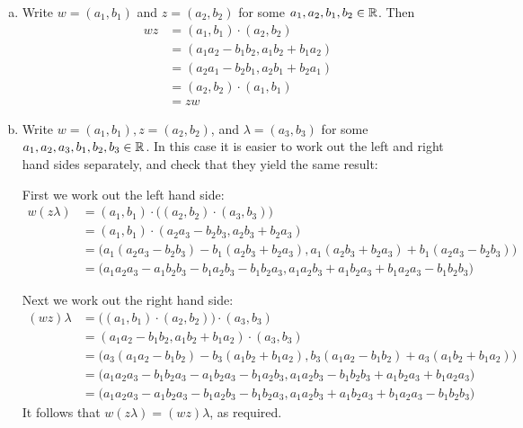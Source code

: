 \documentclass[11pt,fleqn,dvipsnames,usenames]{article}
\begin{document}
\begin{enumerate}
\begin{enumerate}[(a)]
\item Write $w = (a_{1},b_{1})$ and $z = (a_{2},b_{2})$ for some $a_{1},a_{2},b_{1},b_{2}\in\mathbb{R}$.  Then
\begin{align*}
wz &= (a_{1},b_{1})\cdot (a_{2},b_{2})\\
&= (a_{1}a_{2} - b_{1}b_{2},a_{1}b_{2} + b_{1}a_{2})\\
&= (a_{2}a_{1} - b_{2}b_{1},a_{2}b_{1} + b_{2}a_{1})\\
&= (a_{2},b_{2})\cdot (a_{1},b_{1})\\
&= zw
\end{align*}

\item \label{associativityofmult} Write $w = (a_{1},b_{1}), z = (a_{2},b_{2})$, and $\lambda = (a_{3},b_{3})$ for some $a_{1},a_{2},a_{3},b_{1},b_{2},b_{3}\in\mathbb{R}$.  In this case it is easier to work out the left and right hand sides separately, and check that they yield the same result:
\vsmsp

First we work out the left hand side:
\begin{align*}
w(z\lambda) &= (a_{1},b_{1})\cdot\big((a_{2},b_{2})\cdot (a_{3},b_{3})\big)\\
&= (a_{1},b_{1})\cdot (a_{2}a_{3} - b_{2}b_{3},a_{2}b_{3} + b_{2}a_{3})\\
&= \big(a_{1}(a_{2}a_{3}-b_{2}b_{3}) - b_{1}(a_{2}b_{3} + b_{2}a_{3}), a_{1}(a_{2}b_{3} + b_{2}a_{3}) + b_{1}(a_{2}a_{3} - b_{2}b_{3})\big)\\
&= \big(a_{1}a_{2}a_{3} - a_{1}b_{2}b_{3} - b_{1}a_{2}b_{3} - b_{1}b_{2}a_{3}, a_{1}a_{2}b_{3} + a_{1}b_{2}a_{3} + b_{1}a_{2}a_{3} - b_{1}b_{2}b_{3}\big)
\end{align*}

Next we work out the right hand side:
\begin{align*}
(wz)\lambda &= \big((a_{1},b_{1})\cdot(a_{2},b_{2})\big)\cdot (a_{3},b_{3})\\
&= (a_{1}a_{2} - b_{1}b_{2}, a_{1}b_{2} + b_{1}a_{2})\cdot (a_{3},b_{3})\\
&= \big(a_{3}(a_{1}a_{2} - b_{1}b_{2}) - b_{3}(a_{1}b_{2} + b_{1}a_{2}), b_{3}(a_{1}a_{2} - b_{1}b_{2}) + a_{3}(a_{1}b_{2} + b_{1}a_{2})\big)\\
&= \big(a_{1}a_{2}a_{3} - b_{1}b_{2}a_{3} - a_{1}b_{2}a_{3} - b_{1}a_{2}b_{3}, a_{1}a_{2}b_{3} - b_{1}b_{2}b_{3}+a_{1}b_{2}a_{3} + b_{1}a_{2}a_{3}\big)\\
&= \big(a_{1}a_{2}a_{3} - a_{1}b_{2}a_{3} - b_{1}a_{2}b_{3} - b_{1}b_{2}a_{3}, a_{1}a_{2}b_{3} + a_{1}b_{2}a_{3} + b_{1}a_{2}a_{3} - b_{1}b_{2}b_{3} \big)
\end{align*}
It follows that $w(z\lambda) = (wz)\lambda$, as required.


\end{enumerate}
\end{enumerate}
\end{document}
